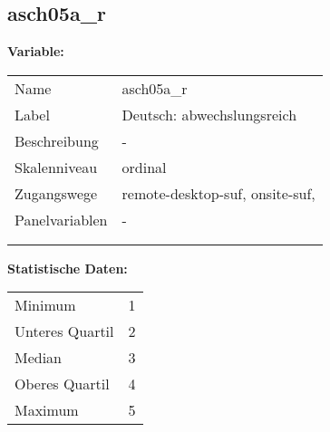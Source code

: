 	
	
	\subsection{asch05a\_r}
	\label{subSection:asch05a_r}

	\noindent\textbf{Variable:}\\
		\begin{tabular}{lL{11.3cm}}
			\label{tableVariable:asch05a_r}
			Name & asch05a\_r \\
			Label & Deutsch: abwechslungsreich \\
			Beschreibung & - \\
			Skalenniveau & ordinal \\
			Zugangswege &
				remote-desktop-suf,
				onsite-suf,
 \\
			Panelvariablen & -
			 \\
			 \\
 \\
		\end{tabular}



		\vspace*{1 cm}
		\noindent\textbf{Statistische Daten:}\\
			\begin{tabular}{ll}
				\label{tableStatistics:asch05a_r}
					Minimum & 1 \\
					Unteres Quartil & 2 \\
					Median & 3 \\
					Oberes Quartil & 4 \\
					Maximum & 5 \\
			\end{tabular}




